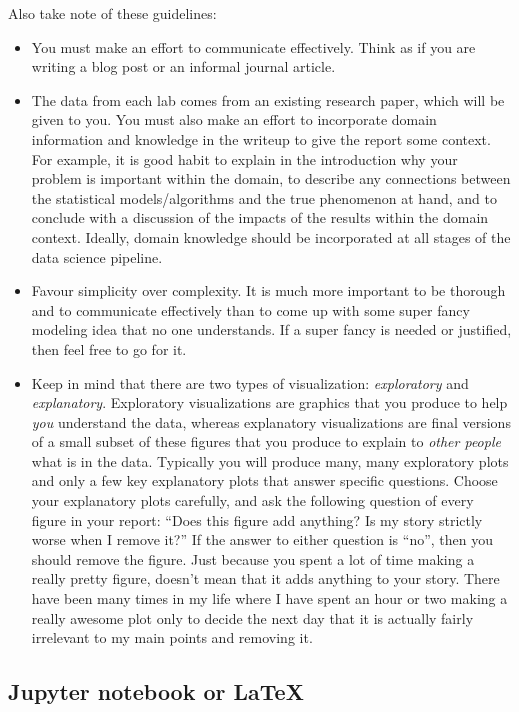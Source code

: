 \documentclass[letterpaper,12pt]{article}
\begin{document}
Also take note of these guidelines:
\begin{itemize}
    \item You must make an effort to communicate effectively. Think as if you are writing a blog post or an informal journal article.
    \item The data from each lab comes from an existing research paper, which will be given to you. You must also make an effort to incorporate domain information and knowledge in the writeup to give the report some context. For example, it is good habit to explain in the introduction why your problem is important within the domain, to describe any connections between the statistical models/algorithms and the true phenomenon at hand, and to conclude with a discussion of the impacts of the results within the domain context. Ideally, domain knowledge should be incorporated at all stages of the data science pipeline.
    \item Favour simplicity over complexity. It is much more important to be thorough and to communicate effectively than to come up with some super fancy modeling idea that no one understands. If a super fancy is needed or justified, then feel free to go for it.
    \item Keep in mind that there are two types of visualization: \textit{exploratory} and \textit{explanatory}. Exploratory visualizations are graphics that you produce to help \textit{you} understand the data, whereas explanatory visualizations are final versions of a small subset of these figures that you produce to explain to \textit{other people} what is in the data. Typically you will produce many, many exploratory plots and only a few key explanatory plots that answer specific questions. Choose your explanatory plots carefully, and ask the following question of every figure in your report: ``Does this figure add anything? Is my story strictly worse when I remove it?'' If the answer to either question is ``no'', then you should remove the figure. Just because you spent a lot of time making a really pretty figure, doesn't mean that it adds anything to your story. There have been many times in my life where I have spent an hour or two making a really awesome plot only to decide the next day that it is actually fairly irrelevant to my main points and removing it.
\end{itemize}

\subsection{Jupyter notebook or LaTeX}
\end{document}
